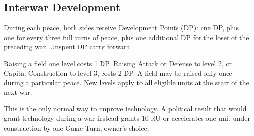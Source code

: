 \subsection{Interwar Development}

During each peace, both sides receive Development Points (DP): one DP, plus one
for every three full turns of peace, plus one additional DP for the loser of
the preceding war. Unspent DP carry forward.

Raising a field one level costs 1 DP. Raising Attack or Defense to level 2, or
Capital Construction to level 3, costs 2 DP. A field may be raised only once
during a particular peace. New levels apply to all eligible units at the start
of the next war.

This is the only normal way to improve technology. A political result that
would grant technology during a war instead grants 10 RU or accelerates one
unit under construction by one Game Turn, owner's choice.
